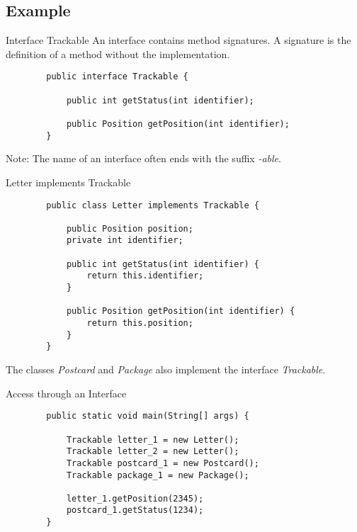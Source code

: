 \subsection{Example}
\begin{frame}[fragile]{Interface Trackable}
	An interface contains method signatures. A signature is the definition of a method without the implementation.
	\begin{lstlisting}
		public interface Trackable {
			
			public int getStatus(int identifier);
			
			public Position getPosition(int identifier);
		}
	\end{lstlisting}
	Note: The name of an interface often ends with the suffix \emph{-able}.
\end{frame}
\begin{frame}[fragile]{Letter implements Trackable}
	\begin{lstlisting}
		public class Letter implements Trackable {
			
			public Position position;
			private int identifier;
			
			public int getStatus(int identifier) {
				return this.identifier;
			}
			
			public Position getPosition(int identifier) {
				return this.position;
			}
		}
	\end{lstlisting}
	The classes \emph{Postcard} and \emph{Package} also implement the interface \emph{Trackable}.
\end{frame}

\begin{frame}[fragile]{Access through an Interface}
	\begin{lstlisting}
		public static void main(String[] args) {
			
			Trackable letter_1 = new Letter();
			Trackable letter_2 = new Letter();
			Trackable postcard_1 = new Postcard();
			Trackable package_1 = new Package();
			
			letter_1.getPosition(2345);
			postcard_1.getStatus(1234);
		}
	\end{lstlisting}
\end{frame}

